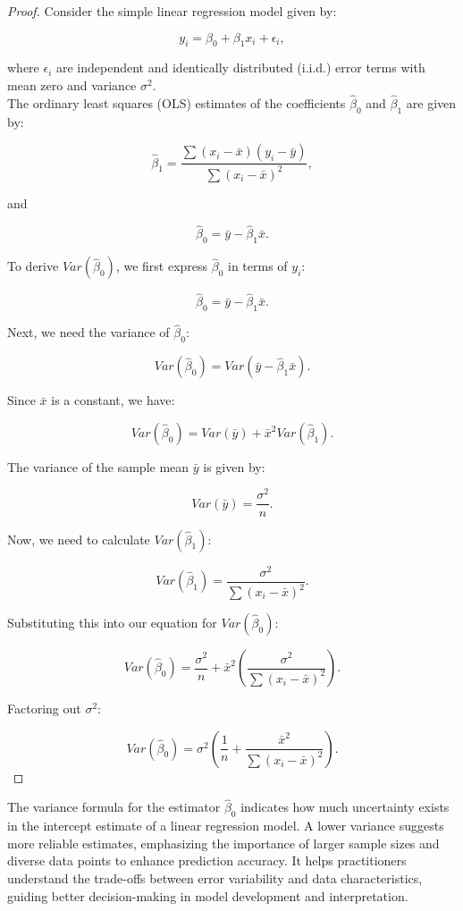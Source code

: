 \begin{proof}
    Consider the simple linear regression model given by:

\[
y_i = \beta_0 + \beta_1 x_i + \epsilon_i,
\]

where \(\epsilon_i\) are independent and identically distributed (i.i.d.) error terms with mean zero and variance \(\sigma^2\). \\

The ordinary least squares (OLS) estimates of the coefficients \(\hat{\beta}_0\) and \(\hat{\beta}_1\) are given by:

\[
\hat{\beta}_1 = \frac{\sum (x_i - \bar{x})(y_i - \bar{y})}{\sum (x_i - \bar{x})^2},
\]

and

\[
\hat{\beta}_0 = \bar{y} - \hat{\beta}_1 \bar{x}.
\]

To derive \(Var(\hat{\beta}_0)\), we first express \(\hat{\beta}_0\) in terms of \(y_i\):

\[
\hat{\beta}_0 = \bar{y} - \hat{\beta}_1 \bar{x}.
\]

Next, we need the variance of \(\hat{\beta}_0\):

\[
Var(\hat{\beta}_0) = Var(\bar{y} - \hat{\beta}_1 \bar{x}).
\]

Since \(\bar{x}\) is a constant, we have:

\[
Var(\hat{\beta}_0) = Var(\bar{y}) + \bar{x}^2 Var(\hat{\beta}_1).
\]

The variance of the sample mean \(\bar{y}\) is given by:

\[
Var(\bar{y}) = \frac{\sigma^2}{n}.
\]

Now, we need to calculate \(Var(\hat{\beta}_1)\):

\[
Var(\hat{\beta}_1) = \frac{\sigma^2}{\sum (x_i - \bar{x})^2}.
\]

Substituting this into our equation for \(Var(\hat{\beta}_0)\):

\[
Var(\hat{\beta}_0) = \frac{\sigma^2}{n} + \bar{x}^2 \left( \frac{\sigma^2}{\sum (x_i - \bar{x})^2} \right).
\]

Factoring out \(\sigma^2\):

\[
Var(\hat{\beta}_0) = \sigma^2 \left( \frac{1}{n} + \frac{\bar{x}^2}{\sum (x_i - \bar{x})^2} \right).
\]
\end{proof}

The variance formula for the estimator \(\hat{\beta}_0\) indicates how much uncertainty exists in the intercept estimate of a linear regression model. A lower variance suggests more reliable estimates, emphasizing the importance of larger sample sizes and diverse data points to enhance prediction accuracy. It helps practitioners understand the trade-offs between error variability and data characteristics, guiding better decision-making in model development and interpretation.

